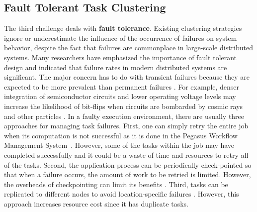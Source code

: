 
\subsection{Fault Tolerant Task Clustering}

The third challenge deals with \textbf{fault tolerance}. Existing clustering strategies ignore or underestimate the influence of the occurrence of failures on system behavior, despite the fact that failures are commonplace in large-scale distributed systems. Many researchers \cite{Zhang2004, Tang1990, Schroeder2006, Sahoo2004} have emphasized the importance of fault tolerant design and indicated that failure rates in modern distributed systems are significant. The major concern has to do with transient failures because they are expected to be more prevalent than permanent failures \cite{Zhang2004}. For example, denser integration of semiconductor circuits and lower operating voltage levels may increase the likelihood of bit-flips when circuits are bombarded by cosmic rays and other particles \cite{Zhang2004}. In a faulty execution environment, there are usually three approaches for managing task failures. First, one can simply retry the entire job when its computation is not successful as it is done in the Pegasus Workflow Management System~\cite{Deelman2004}. However, some of the tasks within the job may have completed successfully and it could be a waste of time and resources to retry all of the tasks. Second, the application process can be periodically check-pointed so that when a failure occurs, the amount of work to be retried is limited. However, the overheads of checkpointing can limit its benefits \cite{Zhang2004}. Third, tasks can be replicated to different nodes to avoid location-specific failures \cite{Zhang2009}. However, this approach increases resource cost since it has duplicate tasks. 

